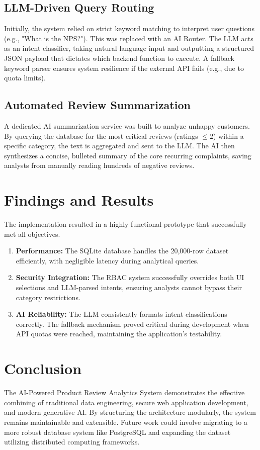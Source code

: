 \documentclass[12pt,a4paper]{article}
\begin{document}
\subsection{LLM-Driven Query Routing}
Initially, the system relied on strict keyword matching to interpret user questions (e.g., "What is the NPS?"). This was replaced with an AI Router. The LLM acts as an intent classifier, taking natural language input and outputting a structured JSON payload that dictates which backend function to execute. A fallback keyword parser ensures system resilience if the external API fails (e.g., due to quota limits).

\subsection{Automated Review Summarization}
A dedicated AI summarization service was built to analyze unhappy customers. By querying the database for the most critical reviews (ratings $\le 2$) within a specific category, the text is aggregated and sent to the LLM. The AI then synthesizes a concise, bulleted summary of the core recurring complaints, saving analysts from manually reading hundreds of negative reviews.

\section{Findings and Results}
The implementation resulted in a highly functional prototype that successfully met all objectives.
\begin{enumerate}
    \item \textbf{Performance:} The SQLite database handles the 20,000-row dataset efficiently, with negligible latency during analytical queries.
    \item \textbf{Security Integration:} The RBAC system successfully overrides both UI selections and LLM-parsed intents, ensuring analysts cannot bypass their category restrictions.
    \item \textbf{AI Reliability:} The LLM consistently formats intent classifications correctly. The fallback mechanism proved critical during development when API quotas were reached, maintaining the application's testability.
\end{enumerate}

\section{Conclusion}
The AI-Powered Product Review Analytics System demonstrates the effective combining of traditional data engineering, secure web application development, and modern generative AI. By structuring the architecture modularly, the system remains maintainable and extensible. Future work could involve migrating to a more robust database system like PostgreSQL and expanding the dataset utilizing distributed computing frameworks.
\end{document}
